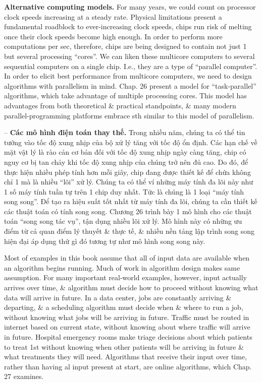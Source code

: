 \documentclass{article}
\begin{document}
\begin{itemize}
\begin{itemize}
\begin{itemize}
            {\bf Alternative computing models.} For many years, we could count on processor clock speeds increasing at a steady rate. Physical limitations present a fundamental roadblock to ever-increasing clock speeds, chips run risk of melting once their clock speeds become high enough. In order to perform more computations per sec, therefore, chips are being designed to contain not just 1 but several processing ``cores''. We can liken these multicore computers to several sequential computers on a single chip. I.e., they are a type of ``parallel computer''. In order to elicit best performance from multicore computers, we need to design algorithms with parallelism in mind. Chap. 26 present a model for ``task-parallel'' algorithms, which take advantage of multiple processing cores. This model has advantages from both theoretical \& practical standpoints, \& many modern parallel-programming platforms embrace sth similar to this model of parallelism.
            
            -- {\bf Các mô hình điện toán thay thế.} Trong nhiều năm, chúng ta có thể tin tưởng vào tốc độ xung nhịp của bộ xử lý tăng với tốc độ ổn định. Các hạn chế về mặt vật lý là rào cản cơ bản đối với tốc độ xung nhịp ngày càng tăng, chip có nguy cơ bị tan chảy khi tốc độ xung nhịp của chúng trở nên đủ cao. Do đó, để thực hiện nhiều phép tính hơn mỗi giây, chip đang được thiết kế để chứa không chỉ 1 mà là nhiều ``lõi'' xử lý. Chúng ta có thể ví những máy tính đa lõi này như 1 số máy tính tuần tự trên 1 chip duy nhất. Tức là chúng là 1 loại ``máy tính song song''. Để tạo ra hiệu suất tốt nhất từ máy tính đa lõi, chúng ta cần thiết kế các thuật toán có tính song song. Chương 26 trình bày 1 mô hình cho các thuật toán ``song song tác vụ'', tận dụng nhiều lõi xử lý. Mô hình này có những ưu điểm từ cả quan điểm lý thuyết \& thực tế, \& nhiều nền tảng lập trình song song hiện đại áp dụng thứ gì đó tương tự như mô hình song song này.
            
            Most of examples in this book assume that all of input data are available when an algorithm begins running. Much of work in algorithm design makes same assumption. For many important real-world examples, however, input actually arrives over time, \& algorithm must decide how to proceed without knowing what data will arrive in future. In a data center, jobs are constantly arriving \& departing, \& a scheduling algorithm must decide when \& where to run a job, without knowing what jobs will be arriving in future. Traffic must be routed in internet based on current state, without knowing about where traffic will arrive in future. Hospital emergency rooms make triage decisions about which patients to treat 1st without knowing when other patients will be arriving in future \& what treatments they will need. Algorithms that receive their input over time, rather than having al input present at start, are online algorithms, which Chap. 27 examines.
            

\end{itemize}
\end{itemize}
\end{itemize}
\end{document}
